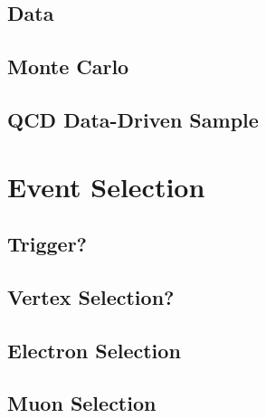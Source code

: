 \begin{comment}
There are additional MC corrections that go beyond the scope of this proposal, but which are nevertheless used in the analysis.
The jet energy corrections and jet energy resolution scale factors make sure that the energy and resolution of the jets in MC matches those used in data and that the overall scale is correct.
The $\ETslash_{\varphi}$ corrections remove a modulation in the \ETslash 4-momentum, which appears as a function of the number of proton-proton interactions.
There is a reweighting of the events to correct the b-tag discriminant distributions and a reweighting to correct the \pt distributions of the \ttbar MC being used.
We also correct for a mis-modeling of the $\cos\left(\theta_{l}\right)$ angular variable and to accurately model QCD in the isolated lepton region even when the data-driven QCD sample is taken from the anti-isolated lepton region.




\end{comment}

\subsection{Data}
\label{sec:data}
\subsection{Monte Carlo}
\subsection{QCD Data-Driven Sample}

\section{Event Selection}
\subsection{Trigger?}
\subsection{Vertex Selection?}
\subsection{Electron Selection}
\subsection{Muon Selection}
